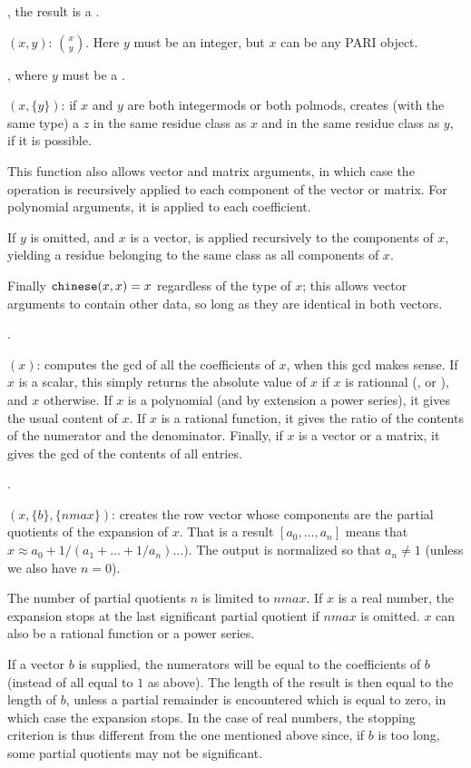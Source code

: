 , the result is a .

$(x,y)$:  $\binom x y$.
Here $y$ must be an integer, but $x$ can be any PARI object.

, where $y$ must be a .

$(x,\{y\})$: if $x$ and $y$ are both integermods or both
polmods, creates (with the same type) a $z$ in the same residue class
as $x$ and in the same residue class as $y$, if it is possible.

This function also allows vector and matrix arguments, in which case the
operation is recursively applied to each component of the vector or matrix.
For polynomial arguments, it is applied to each coefficient.

If $y$ is omitted, and $x$ is a vector,  is applied recursively
to the components of $x$, yielding a residue belonging to the same class as all
components of $x$.

Finally ${\tt chinese}(x,x) = x$ regardless of the type of $x$; this allows
vector arguments to contain other data, so long as they are identical in both
vectors.

.

$(x)$: computes the gcd of all the coefficients of $x$,
when this gcd makes sense. If $x$ is a scalar, this simply returns the
absolute value of $x$ if $x$ is rationnal (,  or
), and $x$ otherwise. If $x$ is a polynomial (and by extension a
power series), it gives the usual content of $x$. If $x$ is a rational
function, it gives the ratio of the contents of the numerator and the
denominator. Finally, if $x$ is a vector or a matrix, it gives the gcd of the
contents of all entries.

.

$(x,\{b\},\{nmax\})$: creates the row vector whose
components are the partial quotients of the 
expansion of $x$. That is a result $[a_0,\dots,a_n]$ means that
$x \approx a_0+1/(a_1+\dots+1/a_n)\dots)$. The output is normalized so that
$a_n \neq 1$ (unless we also have $n = 0$).

The number of partial quotients $n$ is limited to $nmax$. If $x$ is a real
number, the expansion stops at the last significant partial quotient if $nmax$
is omitted. $x$ can also be a rational function or a power series.

If a vector $b$ is supplied, the numerators will be equal to the coefficients
of $b$ (instead of all equal to $1$ as above). The length of the result is
then equal to the length of $b$, unless a partial remainder is encountered
which is equal to zero, in which case the expansion stops. In the case of real
numbers, the stopping criterion is thus different from the one mentioned above
since, if $b$ is too long, some partial quotients may not be significant.

